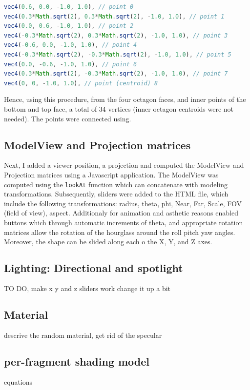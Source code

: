 \documentclass[12pt,a4paper]{article}
\begin{document}
\begin{lstlisting}[caption={Bottom Octagon example vertex defintions},label={lst:bottomoctagon},language=JavaScript]
vec4(0.6, 0.0, -1.0, 1.0), // point 0
vec4(0.3*Math.sqrt(2), 0.3*Math.sqrt(2), -1.0, 1.0), // point 1
vec4(0.0, 0.6, -1.0, 1.0), // point 2
vec4(-0.3*Math.sqrt(2), 0.3*Math.sqrt(2), -1.0, 1.0), // point 3
vec4(-0.6, 0.0, -1.0, 1.0), // point 4
vec4(-0.3*Math.sqrt(2), -0.3*Math.sqrt(2), -1.0, 1.0), // point 5
vec4(0.0, -0.6, -1.0, 1.0), // point 6
vec4(0.3*Math.sqrt(2), -0.3*Math.sqrt(2), -1.0, 1.0), // point 7
vec4(0, 0, -1.0, 1.0), // point (centroid) 8
\end{lstlisting}

Hence, using this procedure, from the four octagon faces, and inner points of the bottom and top face, a total of 34 vertices  (inner octagon centroids were not needed). The points were connected using.

\subsection{ModelView and Projection matrices}

Next, I added a viewer position, a projection and computed the ModelView and Projection matrices using a Javascript application. The ModelView was computed using the \texttt{lookAt} function which can concatenate with modeling transformations. Subsequently, sliders were added to the HTML file, which include the following transformations: radius, theta, phi, Near, Far, Scale, FOV (field of view), aspect. Additionaly for animation and asthetic reasons enabled buttons which through automatic increments of theta, and appropriate rotation matrices allow the rotation of the hourglass around the roll pitch yaw angles. Moreover, the shape can be slided along each o the X, Y, and Z axes.

\subsection{Lighting: Directional and spotlight}
TO DO, make x y and z sliders work
change it up a bit
\subsection{Material}
descrive the random material, get rid of the specular
\subsection{per-fragment shading model}
equations
\end{document}
